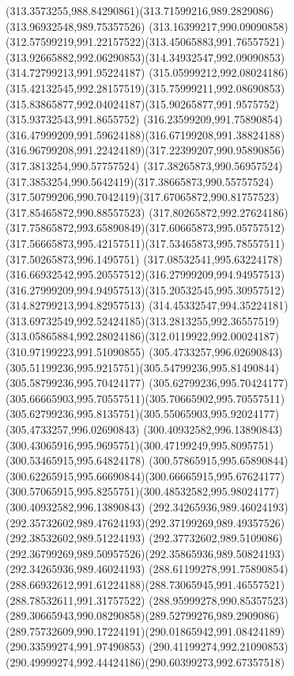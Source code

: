 {{  \curveto(313.3573255,988.84290861)(313.71599216,989.2829086)(313.96932548,989.75357526)
  \curveto(313.16399217,990.09090858)(312.57599219,991.22157522)(313.45065883,991.76557521)
  \curveto(313.92665882,992.06290853)(314.34932547,992.09090853)(314.72799213,991.95224187)
  \curveto(315.05999212,992.08024186)(315.42132545,992.28157519)(315.75999211,992.08690853)
  \curveto(315.83865877,992.04024187)(315.90265877,991.9575752)(315.93732543,991.8655752)
  \curveto(316.23599209,991.75890854)(316.47999209,991.59624188)(316.67199208,991.38824188)
  \curveto(316.96799208,991.22424189)(317.22399207,990.95890856)(317.3813254,990.57757524)
  \curveto(317.38265873,990.56957524)(317.3853254,990.5642419)(317.38665873,990.55757524)
  \curveto(317.50799206,990.7042419)(317.67065872,990.81757523)(317.85465872,990.88557523)
  \curveto(317.80265872,992.27624186)(317.75865872,993.65890849)(317.60665873,995.05757512)
  \curveto(317.56665873,995.42157511)(317.53465873,995.78557511)(317.50265873,996.1495751)
  \curveto(317.08532541,995.63224178)(316.66932542,995.20557512)(316.27999209,994.94957513)
  \curveto(316.27999209,994.94957513)(315.20532545,995.30957512)(314.82799213,994.82957513)
  \curveto(314.45332547,994.35224181)(313.69732549,992.52424185)(313.2813255,992.36557519)
  \curveto(313.05865884,992.28024186)(312.0119922,992.00024187)(310.97199223,991.51090855)
  \moveto(305.4733257,996.02690843)
  \curveto(305.51199236,995.9215751)(305.54799236,995.81490844)(305.58799236,995.70424177)
  \curveto(305.62799236,995.70424177)(305.66665903,995.70557511)(305.70665902,995.70557511)
  \curveto(305.62799236,995.8135751)(305.55065903,995.92024177)(305.4733257,996.02690843)
  \moveto(300.40932582,996.13890843)
  \curveto(300.43065916,995.9695751)(300.47199249,995.8095751)(300.53465915,995.64824178)
  \curveto(300.57865915,995.65890844)(300.62265915,995.66690844)(300.66665915,995.67624177)
  \curveto(300.57065915,995.8255751)(300.48532582,995.98024177)(300.40932582,996.13890843)
  \moveto(292.34265936,989.46024193)
  \curveto(292.35732602,989.47624193)(292.37199269,989.49357526)(292.38532602,989.51224193)
  \curveto(292.37732602,989.5109086)(292.36799269,989.50957526)(292.35865936,989.50824193)
  \lineto(292.34265936,989.46024193)
  \moveto(288.61199278,991.75890854)
  \curveto(288.66932612,991.61224188)(288.73065945,991.46557521)(288.78532611,991.31757522)
  \curveto(288.95999278,990.85357523)(289.30665943,990.08290858)(289.52799276,989.2909086)
  \curveto(289.75732609,990.17224191)(290.01865942,991.08424189)(290.33599274,991.97490853)
  \curveto(290.41199274,992.21090853)(290.49999274,992.44424186)(290.60399273,992.67357518)
}}
